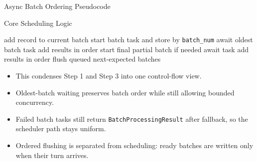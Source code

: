 \documentclass[
        11pt,
        compress,
        xcolor={dvipsnames}
    ]{beamer}
\begin{document}
\begin{frame}[shrink=2]{Async Batch Ordering Pseudocode}
  \begin{block}{Core Scheduling Logic}
    \scriptsize
    \begin{algorithmic}
          \State add record to current batch
            \State start batch task and store by \texttt{batch\_num}
              \State await oldest batch task
              \State add results in order
            \EndIf
          \EndIf
        \EndFor
        \State start final partial batch if needed
          \State await task
          \State add results in order
        \EndFor
          \State flush queued next-expected batches
        \EndIf
      \EndProcedure
    \end{algorithmic}
  \end{block}
  \scriptsize
  \begin{itemize}\setlength{\itemsep}{0.1em}
    \item This condenses Step 1 and Step 3 into one control-flow view.
    \item Oldest-batch waiting preserves batch order while still allowing bounded concurrency.
    \item Failed batch tasks still return \texttt{BatchProcessingResult} after fallback, so the scheduler path stays uniform.
    \item Ordered flushing is separated from scheduling: ready batches are written only when their turn arrives.
  \end{itemize}
\end{frame}
\end{document}
